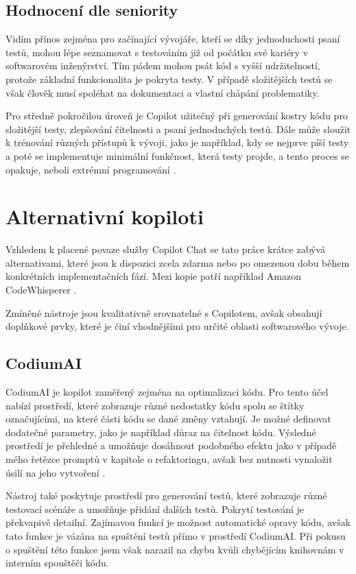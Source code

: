 \documentclass[FM,DP]{tulthesis}
\begin{document}
		\subsection{Hodnocení dle seniority}
		Vidím přínos zejména pro začínající vývojáře, kteří se díky jednoduchosti psaní testů, mohou lépe seznamovat s testováním již od počátku své kariéry v softwarovém inženýrství. Tím pádem mohou psát kód s vyšší udržitelností, protože základní funkcionalita je pokryta testy. V případě složitějších testů se však člověk musí spoléhat na dokumentaci a vlastní chápání problematiky.
		
		Pro středně pokročilou úroveň je Copilot užitečný při generování kostry kódu pro složitější testy, zlepšování čitelnosti a psaní jednoduchých testů. Dále může sloužit k trénování různých přístupů k vývoji, jako je například, kdy se nejprve píší testy a poté se implementuje minimální funkčnost, která testy projde, a tento proces se opakuje, neboli extrémní programování \cite{TDD}.
		
		\section{Alternativní kopiloti}
		Vzhledem k placené povaze služby Copilot Chat se tato práce krátce zabývá alternativami, které jsou k dispozici zcela zdarma nebo po omezenou dobu během konkrétních implementačních fází. Mezi kopie patří například Amazon CodeWhisperer \cite{codewhisperer}. 
		
		Zmíněné nástroje jsou kvalitativně srovnatelné s Copilotem, avšak obsahují doplňkové prvky, které je činí vhodnějšími pro určité oblasti softwarového vývoje.
		
		\subsection{CodiumAI}
		CodiumAI je kopilot zaměřený zejména na optimalizaci kódu. Pro tento účel nabízí prostředí, které zobrazuje různé nedostatky kódu spolu se štítky označujícími, na které části kódu se dané změny vztahují. Je možné definovat dodatečné parametry, jako je například důraz na čitelnost kódu. Výsledné prostředí je přehledné a umožňuje dosáhnout podobného efektu jako v případě mého řetězce promptů v kapitole o refaktoringu, avšak bez nutnosti vynaložit úsilí na jeho vytvoření \cite{codium}.
		
		Nástroj také poskytuje prostředí pro generování testů, které zobrazuje různé testovací scénáře a umožňuje přidání dalších testů. Pokrytí testování je překvapivě detailní. Zajímavou funkcí je možnost automatické opravy kódu, avšak tato funkce je vázána na spuštění testů přímo v prostředí CodiumAI. Při pokusu o spuštění této funkce jsem však narazil na chybu kvůli chybějícím knihovnám v interním spouštěči kódu.
		
\end{document}
